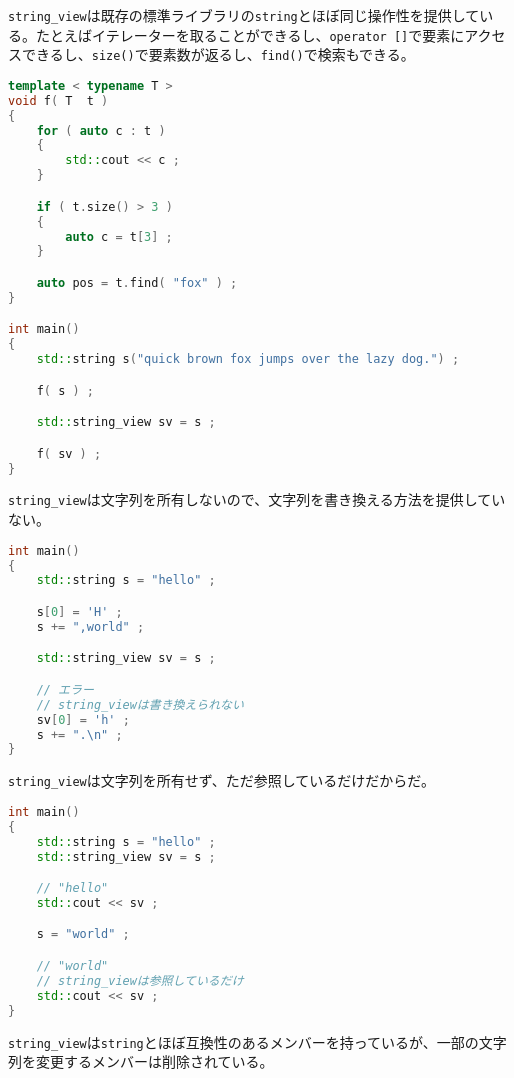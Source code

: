 %

\lstinline!string_view!は既存の標準ライブラリの\lstinline!string!とほぼ同じ操作性を提供している。たとえばイテレーターを取ることができるし、\lstinline!operator []!で要素にアクセスできるし、\lstinline!size()!で要素数が返るし、\lstinline!find()!で検索もできる。

\begin{lstlisting}[language=C++]
template < typename T >
void f( T  t )
{
    for ( auto c : t )
    {
        std::cout << c ;
    }

    if ( t.size() > 3 )
    {
        auto c = t[3] ;
    }

    auto pos = t.find( "fox" ) ;
}

int main()
{
    std::string s("quick brown fox jumps over the lazy dog.") ;

    f( s ) ;

    std::string_view sv = s ;

    f( sv ) ;
}
\end{lstlisting}

\lstinline!string_view!は文字列を所有しないので、文字列を書き換える方法を提供していない。

\begin{lstlisting}[language=C++]
int main()
{
    std::string s = "hello" ;

    s[0] = 'H' ;
    s += ",world" ;

    std::string_view sv = s ;

    // エラー
    // string_viewは書き換えられない
    sv[0] = 'h' ;
    s += ".\n" ;
}
\end{lstlisting}

\lstinline!string_view!は文字列を所有せず、ただ参照しているだけだからだ。

\begin{lstlisting}[language=C++]
int main()
{
    std::string s = "hello" ;
    std::string_view sv = s ;

    // "hello"
    std::cout << sv ;

    s = "world" ;

    // "world"
    // string_viewは参照しているだけ
    std::cout << sv ;
}
\end{lstlisting}

\lstinline!string_view!は\lstinline!string!とほぼ互換性のあるメンバーを持っているが、一部の文字列を変更するメンバーは削除されている。

